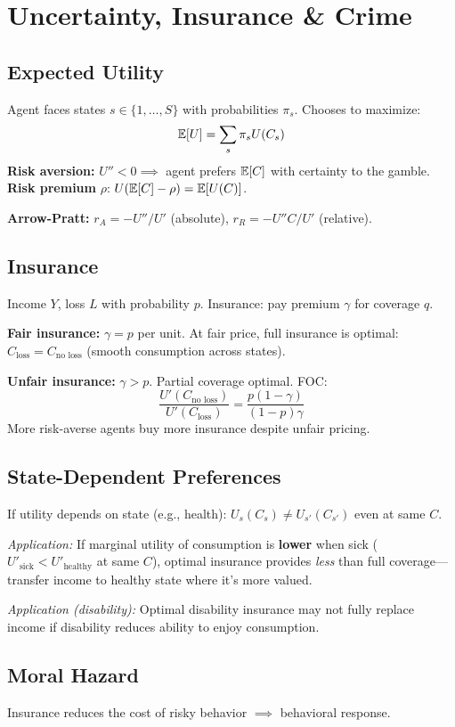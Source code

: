 \section{Uncertainty, Insurance \& Crime}

\subsection{Expected Utility}
Agent faces states $s \in \{1,\ldots,S\}$ with probabilities $\pi_s$. Chooses to maximize:
$$\mathbb{E}[U] = \sum_s \pi_s U(C_s)$$
\textbf{Risk aversion:} $U'' < 0 \implies$ agent prefers $\mathbb{E}[C]$ with certainty to the gamble. \textbf{Risk premium} $\rho$: $U(\mathbb{E}[C]-\rho) = \mathbb{E}[U(C)]$.

\textbf{Arrow-Pratt:} $r_A = -U''/U'$ (absolute), $r_R = -U''C/U'$ (relative).

\subsection{Insurance}
Income $Y$, loss $L$ with probability $p$. Insurance: pay premium $\gamma$ for coverage $q$.

\textbf{Fair insurance:} $\gamma = p$ per unit. At fair price, full insurance is optimal: $C_{\text{loss}} = C_{\text{no loss}}$ (smooth consumption across states).

\textbf{Unfair insurance:} $\gamma > p$. Partial coverage optimal. FOC:
$$\frac{U'(C_{\text{no loss}})}{U'(C_{\text{loss}})} = \frac{p(1-\gamma)}{(1-p)\gamma}$$
More risk-averse agents buy more insurance despite unfair pricing.

\subsection{State-Dependent Preferences}
If utility depends on state (e.g., health): $U_s(C_s) \neq U_{s'}(C_{s'})$ even at same $C$.

\textit{Application:} If marginal utility of consumption is \textbf{lower} when sick ($U'_{\text{sick}} < U'_{\text{healthy}}$ at same $C$), optimal insurance provides \textit{less} than full coverage---transfer income to healthy state where it's more valued.

\textit{Application (disability):} Optimal disability insurance may not fully replace income if disability reduces ability to enjoy consumption.

\subsection{Moral Hazard}
Insurance reduces the cost of risky behavior $\implies$ behavioral response.

